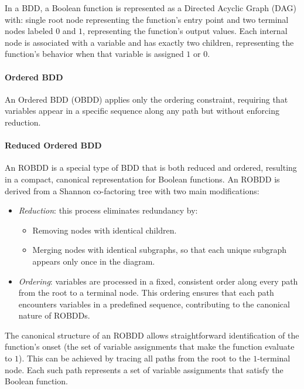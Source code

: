 In a BDD, a Boolean function is represented as a Directed Acyclic Graph (DAG) with: single root node representing the function's entry point and two terminal nodes labeled $0$ and $1$, representing the function's output values.
Each internal node is associated with a variable and has exactly two children, representing the function's behavior when that variable is assigned $1$ or $0$.

\paragraph*{Ordered BDD}
An Ordered BDD (OBDD) applies only the ordering constraint, requiring that variables appear in a specific sequence along any path but without enforcing reduction.

\paragraph*{Reduced Ordered BDD}
An ROBDD is a special type of BDD that is both reduced and ordered, resulting in a compact, canonical representation for Boolean functions.
An ROBDD is derived from a Shannon co-factoring tree with two main modifications:
\begin{itemize}
    \item \textit{Reduction}: this process eliminates redundancy by: 
        \begin{itemize}
            \item Removing nodes with identical children.
            \item Merging nodes with identical subgraphs, so that each unique subgraph appears only once in the diagram.
        \end{itemize}
    \item \textit{Ordering}: variables are processed in a fixed, consistent order along every path from the root to a terminal node. 
        This ordering ensures that each path encounters variables in a predefined sequence, contributing to the canonical nature of ROBDDs.
\end{itemize}
The canonical structure of an ROBDD allows straightforward identification of the function's onset (the set of variable assignments that make the function evaluate to $1$). 
This can be achieved by tracing all paths from the root to the $1$-terminal node. 
Each such path represents a set of variable assignments that satisfy the Boolean function.


